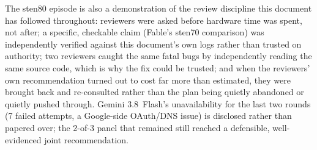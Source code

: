 \documentclass[11pt]{article}
\begin{document}
The sten80 episode is also a demonstration of the review discipline this document has followed
throughout: reviewers were asked before hardware time was spent, not after; a specific, checkable
claim (Fable's sten70 comparison) was independently verified against this document's own logs rather
than trusted on authority; two reviewers caught the same fatal bugs by independently reading the same
source code, which is why the fix could be trusted; and when the reviewers' own recommendation turned
out to cost far more than estimated, they were brought back and re-consulted rather than the plan
being quietly abandoned or quietly pushed through. Gemini 3.8~Flash's unavailability for the last two
rounds (7 failed attempts, a Google-side OAuth/DNS issue) is disclosed rather than papered over; the
2-of-3 panel that remained still reached a defensible, well-evidenced joint recommendation.
\end{document}
